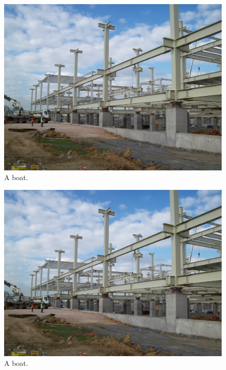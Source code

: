 \documentclass[english]{eqconf}
\begin{document}
\blindtext
\begin{figure}
	\vspace{-12pt}
	\centering
	\includegraphics[scale=0.2]{b.PNG}
	\caption{A boat.}
	\label{fig:boat1}
	\vspace{-10pt}
\end{figure}
\blindtext

\blindtext

\blindtext


\begin{figure}[]
	\centering
	\includegraphics[scale=0.4]{b.PNG}
	\caption{A boat.}
	\label{fig:boat1}
\end{figure}
\end{document}
